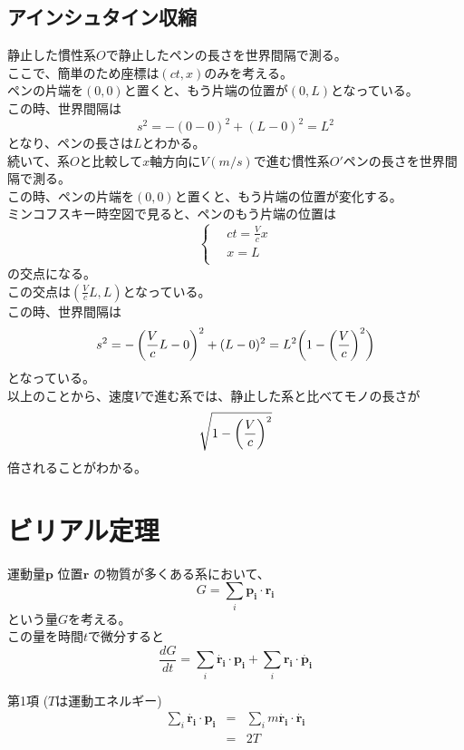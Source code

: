 \documentclass[dvipdfmx]{report} %
\begin{document}
\subsection{
    アインシュタイン収縮
}
静止した慣性系$O$で静止したペンの長さを世界間隔で測る。\\
ここで、簡単のため座標は$(ct, x)$のみを考える。\\
ペンの片端を$(0, 0)$と置くと、もう片端の位置が$(0, L)$となっている。\\
この時、世界間隔は
$$s^2 = - (0-0)^2 + (L-0)^2 = L^2$$
となり、ペンの長さは$L$とわかる。\\
続いて、系$O$と比較して$x$軸方向に$V(m/s)$で進む慣性系$O'$ペンの長さを世界間隔で測る。\\
この時、ペンの片端を$(0, 0)$と置くと、もう片端の位置が変化する。\\
ミンコフスキー時空図で見ると、ペンのもう片端の位置は
\begin{equation}
    \left\{ \,
        \begin{aligned}
        & ct = \frac{V}{c} x \\
        & x = L \\
        \end{aligned}
    \right.
\end{equation}
の交点になる。\\
この交点は$(\frac{V}{c} L, L)$となっている。\\
この時、世界間隔は
$$s^2 = - \left( \frac{V}{c} L - 0 \right) ^2 + (L-0)^2 = L^2 \biggl{(} 1- \biggl{(} \frac{V}{c} \biggr{)}^2 \biggr{)}$$
となっている。\\
以上のことから、速度$V$で進む系では、静止した系と比べてモノの長さが
$$\sqrt{1 - \biggl{(} \frac{V}{c} \biggr{)}^2}$$
倍されることがわかる。\\

\section{
    ビリアル定理
}
運動量$\bm{p}$ 位置$\bm{r}$ の物質が多くある系において、
$$
G = \sum_{i}{\bm{p_i} \cdot \bm{r_i}}
$$
という量$G$を考える。\\
この量を時間$t$で微分すると
$$\frac{dG}{dt} = \sum_{i} \dot{ \bm{r_i} } \cdot \bm{p_i} + \sum_{i} \bm{r_i} \cdot \dot{ \bm{p_i} }$$

\begin{tcolorbox}
第1項 ($T$は運動エネルギー)\\
\begin{eqnarray*}
 \sum_{i} \dot{ \bm{r_i} } \cdot \bm{p_i} &=& \sum_{i}  m \dot{ \bm{r_i} } \cdot  \dot{ \bm{r_i} }\\
 &=& 2T
\end{eqnarray*}
\end{tcolorbox}
\end{document}
